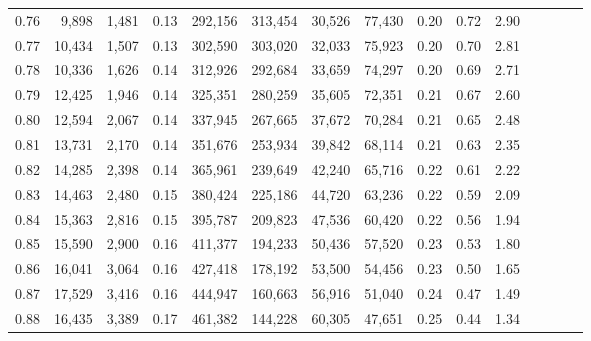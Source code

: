 \begin{tabular}{rrrcrrrrrrrrrrr}
0.76 &   9,898 &  1,481 &                                       0.13 &  292,156 &  313,454 &   30,526 &   77,430 &  0.20 &  0.72 &                         2.90 \\
0.77 &  10,434 &  1,507 &                                       0.13 &  302,590 &  303,020 &   32,033 &   75,923 &  0.20 &  0.70 &                         2.81 \\
0.78 &  10,336 &  1,626 &                                       0.14 &  312,926 &  292,684 &   33,659 &   74,297 &  0.20 &  0.69 &                         2.71 \\
0.79 &  12,425 &  1,946 &                                       0.14 &  325,351 &  280,259 &   35,605 &   72,351 &  0.21 &  0.67 &                         2.60 \\
0.80 &  12,594 &  2,067 &                                       0.14 &  337,945 &  267,665 &   37,672 &   70,284 &  0.21 &  0.65 &                         2.48 \\
0.81 &  13,731 &  2,170 &                                       0.14 &  351,676 &  253,934 &   39,842 &   68,114 &  0.21 &  0.63 &                         2.35 \\
0.82 &  14,285 &  2,398 &                                       0.14 &  365,961 &  239,649 &   42,240 &   65,716 &  0.22 &  0.61 &                         2.22 \\
0.83 &  14,463 &  2,480 &                                       0.15 &  380,424 &  225,186 &   44,720 &   63,236 &  0.22 &  0.59 &                         2.09 \\
0.84 &  15,363 &  2,816 &                                       0.15 &  395,787 &  209,823 &   47,536 &   60,420 &  0.22 &  0.56 &                         1.94 \\
0.85 &  15,590 &  2,900 &                                       0.16 &  411,377 &  194,233 &   50,436 &   57,520 &  0.23 &  0.53 &                         1.80 \\
0.86 &  16,041 &  3,064 &                                       0.16 &  427,418 &  178,192 &   53,500 &   54,456 &  0.23 &  0.50 &                         1.65 \\
0.87 &  17,529 &  3,416 &                                       0.16 &  444,947 &  160,663 &   56,916 &   51,040 &  0.24 &  0.47 &                         1.49 \\
0.88 &  16,435 &  3,389 &                                       0.17 &  461,382 &  144,228 &   60,305 &   47,651 &  0.25 &  0.44 &                         1.34 \\

\end{tabular}
